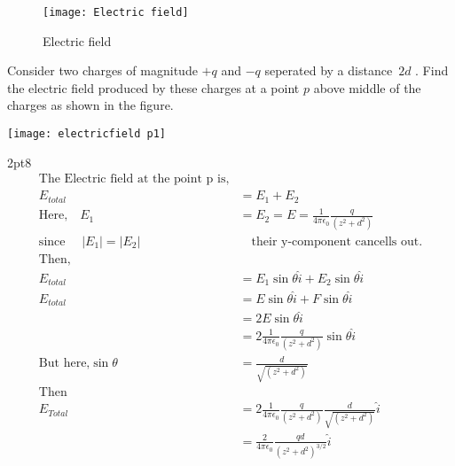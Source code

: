 \begin{minipage}{0.35\textwidth}\hfil
	
\begin{figure}[H]
	\begin{center}
		\texttt{[image: Electric field]}
	\end{center}
\caption{Electric field}
\end{figure}
\end{minipage}


\begin{exercise}
Consider two charges of magnitude $+q$ and  $-q$ seperated by a distance\ $2d$ .
 Find the electric field produced by these charges at a point $p$ above middle of the charges as shown in the figure.
 	\begin{center}
 		\texttt{[image: electricfield p1]}
 	\end{center}
 \end{exercise}
\opencutright
\renewcommand\windowpagestuff{
	\centering\texttt{[image: electricfield p1 ans]}}
\begin{answer}
	\begin{cutout}{3}{\dimexpr\linewidth-4.9cm\relax}{2pt}{8}
		\begin{align*}
		\text{The Electric field at the point p is,}\\
		E_{total}&=E_{1}+E_{2}\\
		\text{Here,}\quad E_{1}&=E_{2}=E=\frac{1}{4 \pi \epsilon_{0}}\frac{q}{(z^{2}+d^{2})}\\
		\text{since }\quad |E_{1}|=|E_{2}| &\quad\text{their y-component cancells out.}\\
		\text{Then,}\\
	E_{total}&=E_{1}\sin\theta \hat{i}+E_{2}\sin\theta \hat{i}\\
		E_{total}&=E\sin\theta \hat{i}+F\sin\theta \hat{i}\\
		&=2E\sin\theta \hat{i}\\
		&=2 \frac{1}{4 \pi \epsilon_{0}}\frac{q}{(z^{2}+d^{2})} \sin\theta \hat{i}\\
		\text{But here,}\sin\theta&=\frac{d}{\sqrt {(z^{2}+d^{2})}}\\
		\text{Then}\\
		E_{Total}&=2 \frac{1}{4 \pi \epsilon_{0}}\frac{q}{(z^{2}+d^{2})}\frac{d}{\sqrt {(z^{2}+d^{2})}}\hat{i}\\
		&= \frac{2}{4 \pi \epsilon_{0}}\frac{qd}{(z^{2}+d^{2})^{3/2}}\hat{i}
		\end{align*}
	\end{cutout}
\end{answer}
